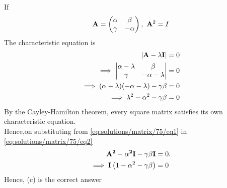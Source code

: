 If  
 \begin{align}
 \mathbf A = \begin{pmatrix} \alpha&\beta\\\gamma&-\alpha\end{pmatrix},\
  \mathbf A^2 = I\label{eq:solutions/matrix/75/eq1}
 \end{align}
The characteristic equation is 
\begin{align}
	\mathbf{|A - \lambda I|} &= 0 
	\\    \implies \begin{vmatrix}\alpha -\lambda & \beta \\ \gamma & -\alpha -\lambda\end{vmatrix} &= 0  
	\\\implies (\alpha -\lambda)(-\alpha -\lambda)-\gamma\beta &= 0
	\\\implies \lambda^2-\alpha^2-\gamma\beta &= 0 \label{eq:solutions/matrix/75/eq2}
\end{align}
By the Cayley-Hamilton theorem, every square matrix satisfies its own characteristic equation.
\\Hence,on substituting from \eqref{eq:solutions/matrix/75/eq1} in \eqref{eq:solutions/matrix/75/eq2}
\begin{align}
\mathbf{A^2-\alpha^2I-\gamma\beta I} &=0.
\\
	\implies \mathbf{I}\left(1-\alpha^2-\gamma\beta\right) &= 0
\end{align}
Hence, (c) is the correct answer


